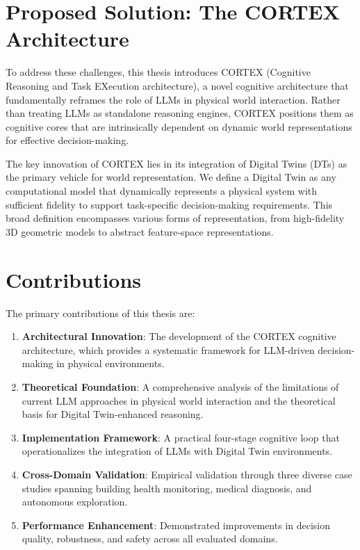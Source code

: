 \section{Proposed Solution: The CORTEX Architecture}

To address these challenges, this thesis introduces CORTEX (Cognitive Reasoning and Task EXecution architecture), a novel cognitive architecture that fundamentally reframes the role of LLMs in physical world interaction. Rather than treating LLMs as standalone reasoning engines, CORTEX positions them as cognitive cores that are intrinsically dependent on dynamic world representations for effective decision-making.

The key innovation of CORTEX lies in its integration of Digital Twins (DTs) as the primary vehicle for world representation. We define a Digital Twin as any computational model that dynamically represents a physical system with sufficient fidelity to support task-specific decision-making requirements. This broad definition encompasses various forms of representation, from high-fidelity 3D geometric models to abstract feature-space representations.

\section{Contributions}

The primary contributions of this thesis are:

\begin{enumerate}
    \item \textbf{Architectural Innovation}: The development of the CORTEX cognitive architecture, which provides a systematic framework for LLM-driven decision-making in physical environments.
    
    \item \textbf{Theoretical Foundation}: A comprehensive analysis of the limitations of current LLM approaches in physical world interaction and the theoretical basis for Digital Twin-enhanced reasoning.
    
    \item \textbf{Implementation Framework}: A practical four-stage cognitive loop that operationalizes the integration of LLMs with Digital Twin environments.
    
    \item \textbf{Cross-Domain Validation}: Empirical validation through three diverse case studies spanning building health monitoring, medical diagnosis, and autonomous exploration.
    
    \item \textbf{Performance Enhancement}: Demonstrated improvements in decision quality, robustness, and safety across all evaluated domains.
\end{enumerate}

